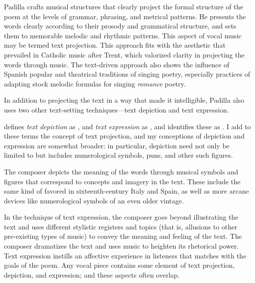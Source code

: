 Padilla crafts musical structures that clearly project the formal structure of
the poem at the levels of grammar, phrasing, and metrical patterns.
He presents the words clearly according to their prosody and grammatical
structure, and sets them to memorable melodic and rhythmic patterns.
This aspect of vocal music may be termed text projection.
This approach fits with the aesthetic that prevailed in Catholic music after
Trent, which valorized clarity in projecting the words through music.
The text-driven approach also shows the influence of Spanish popular and
theatrical traditions of singing poetry, especially practices of adapting stock
melodic formulas for singing \emph{romance} poetry.

In addition to projecting the text in a way that made it intelligible, Padilla
also uses two other text-setting techniques---text depiction and text
expression.%
\begin{Footnote}
    \Autocite[207]{Burkholder:History} defines \emph{text depiction} as
    , and
    \emph{text expression} as , and identifies these as .
    I add to these terms the concept of text projection, and my conceptions of
    depiction and expression are somewhat broader: in particular, depiction need
    not only be limited to  but includes numerological
    symbols, puns, and other such figures.
\end{Footnote}
The composer depicts the meaning of the words through musical symbols and
figures that correspond to concepts and imagery in the text.
These include the same kind of  favored in
sixteenth-century Italy and Spain, as well as more arcane devices like
numerological symbols of an even older vintage.

In the technique of text expression, the composer goes beyond illustrating the
text and uses different stylistic registers and topics (that is, allusions to
other pre-existing types of music) to convey the meaning and feeling of the
text.
The composer dramatizes the text and uses music to heighten its rhetorical
power.
Text expression instills an affective experience in listeners that matches with
the goals of the poem.
Any vocal piece contains some element of text projection, depiction, and
expression; and these aspects often overlap.


